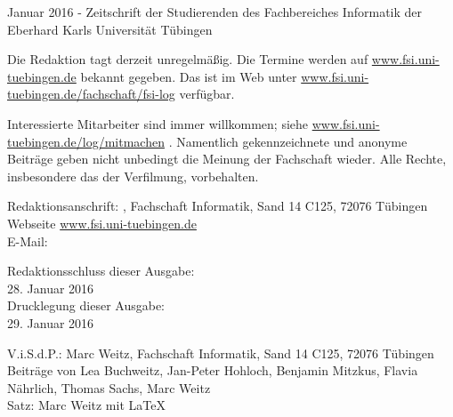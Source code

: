 \nameit \space \space Januar 2016 - Zeitschrift der Studierenden des Fachbereiches Informatik der Eberhard Karls Universität Tübingen

Die Redaktion tagt derzeit unregelmäßig. Die Termine werden auf \url{www.fsi.uni-tuebingen.de} bekannt  gegeben.  Das  \nameit \space ist  im  Web  unter \url{www.fsi.uni-tuebingen.de/fachschaft/fsi-log}  verfügbar.

Interessierte Mitarbeiter sind immer willkommen; 
siehe \url{www.fsi.uni-tuebingen.de/log/mitmachen}
.
Namentlich gekennzeichnete und anonyme Beiträge geben nicht unbedingt die Meinung der Fachschaft wieder. Alle Rechte, insbesondere das der Verfilmung, vorbehalten.

Redaktionsanschrift:
\nameit, Fachschaft Informatik, Sand 14 C125, 72076 Tübingen\\
Webseite \url{www.fsi.uni-tuebingen.de}\\
E-Mail:

Redaktionsschluss dieser Ausgabe:\\
28. Januar 2016\\
Drucklegung dieser Ausgabe:\\
29. Januar 2016

V.i.S.d.P.: Marc Weitz, Fachschaft Informatik, Sand 14 C125, 72076 Tübingen\\
Beiträge von Lea Buchweitz, Jan-Peter Hohloch, Benjamin Mitzkus, Flavia Nährlich, Thomas Sachs, Marc Weitz\\
Satz: Marc Weitz mit \LaTeX 


